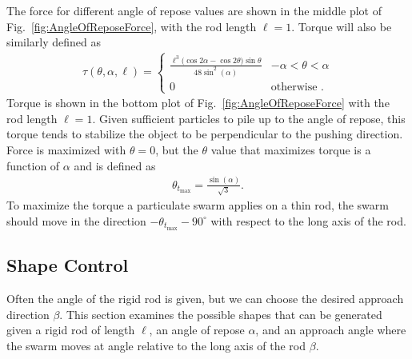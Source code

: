 
The force for different angle of repose values are shown in the middle plot of Fig.~\ref{fig:AngleOfReposeForce}, with the rod length $\ell=1$. 
Torque will also be similarly defined as
\begin{align}
\tau(\theta, \alpha, \ell) =\left\{
\begin{array}{ll}
\frac{\ell^3\Big(\cos{2\alpha}-\cos{2\theta}\Big)\sin{\theta} }{48\sin^2(\alpha)}&   -\alpha<\theta<\alpha\\
0 &    \textrm{otherwise .} 
\end{array} 
\right.  \label{eq:TorqueAOR}
\end{align}
Torque is shown in the bottom plot of Fig.~\ref{fig:AngleOfReposeForce} with the rod length $\ell=1$. 
 Given sufficient particles to pile up to the angle of repose, this torque tends to stabilize the object to be perpendicular to the pushing direction.
Force is maximized with $\theta=0$, but the $\theta$ value that maximizes torque is a function of $\alpha$ and is defined as
\begin{align}\label{eq:maxTorqueAngleGivenAOR}
\theta_{t_{\max}} = \frac{\sin(\alpha)}{\sqrt{3}}.
\end{align}
To maximize the torque a particulate swarm applies on a thin rod, the swarm should move in the direction $-\theta_{t_{\max}} - 90^\circ$ with respect to the long axis of the rod.

\subsection{Shape Control}

Often the angle of the rigid rod is given, but we can choose the desired approach direction $\beta$. 
 This section examines the possible shapes that can be generated given a rigid rod of length $\ell$, an angle of repose $\alpha$, and an approach angle where the swarm moves at angle relative to the long axis of the rod $\beta$.

